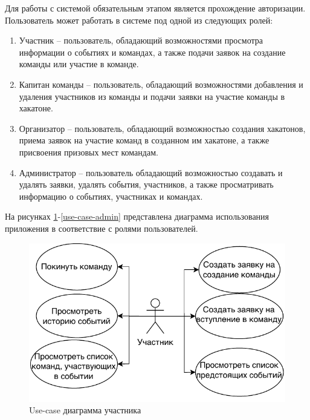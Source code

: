 
Для работы с системой обязательным этапом является прохождение авторизации. Пользователь может работать в системе под одной из следующих ролей:
\begin{enumerate}
	\item Участник -- пользователь, обладающий возможностями просмотра информации о событиях и командах, а также подачи заявок на создание команды или участие в команде.
	\item Капитан команды -- пользователь, обладающий возможностями добавления и удаления участников из команды и подачи заявки на участие команды в хакатоне.
	\item Организатор -- пользователь, обладающий возможностью создания хакатонов, приема заявок на участие команд в созданном им хакатоне, а также присвоения призовых мест командам.
        \item Администратор -- пользователь обладающий возможностью создавать и удалять заявки, удалять события, участников, а также просматривать информацию о событиях, участниках и командах.
\end{enumerate}

На рисунках \ref{use-case-participant}-\ref{use-case-admin} представлена диаграмма использования приложения в соответствие с ролями пользователей.

\begin{figure}[H]
	\begin{center}
		\includegraphics[page=1,scale=1]{assets/use-case-participant.drawio.pdf}
	\end{center}
	\caption{Use-case диаграмма участника}
	\label{use-case-participant}
\end{figure}

